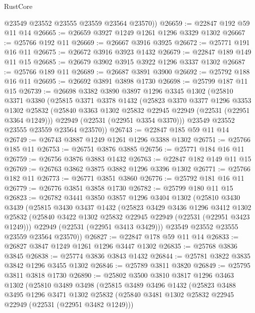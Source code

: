 \begin{lexlean}{RustCore}
\begin{coremodule}
        @23549
        @23552
        @23555
        @23559
        @23564
        @23570))
@26659 := @22847 @192 @59 @11 @14
@26665 := @26659 @3927 @1249 @1261 @1296 @3329 @1302
@26667 := @25766 @192 @11
@26669 := @26667 @3916 @3925
@26672 := @25771 @191 @16 @11
@26675 := @26672 @3916 @3923 @1432
@26679 := @22847 @189 @149 @11 @15
@26685 := @26679 @3902 @3915 @3922 @1296 @3337 @1302
@26687 := @25766 @189 @11
@26689 := @26687 @3891 @3900
@26692 := @25792 @188 @16 @11
@26695 := @26692 @3891 @3898 @1730
@26698 := @25799 @187 @11 @15
@26739 := @26698
    @3382
    @3890
    @3897
    @1296
    @3345
    @1302
    (@25810
      @3371
      @3380
      (@25815
        @3371
        @3378
        @1432
        (@25823
          @3370
          @3377
          @1296
          @3353
          @1302
          @25832
          (@25840 @3363 @1302 @25832 @22945 @22949 (@22531 (@22951 @3364 @1249)))
          @22949
          (@22531 (@22951 @3354 @3370)))
        @23549
        @23552
        @23555
        @23559
        @23564
        @23570))
@26743 := @22847 @185 @59 @11 @14
@26749 := @26743 @3887 @1249 @1261 @1296 @3388 @1302
@26751 := @25766 @185 @11
@26753 := @26751 @3876 @3885
@26756 := @25771 @184 @16 @11
@26759 := @26756 @3876 @3883 @1432
@26763 := @22847 @182 @149 @11 @15
@26769 := @26763 @3862 @3875 @3882 @1296 @3396 @1302
@26771 := @25766 @182 @11
@26773 := @26771 @3851 @3860
@26776 := @25792 @181 @16 @11
@26779 := @26776 @3851 @3858 @1730
@26782 := @25799 @180 @11 @15
@26823 := @26782
    @3441
    @3850
    @3857
    @1296
    @3404
    @1302
    (@25810
      @3430
      @3439
      (@25815
        @3430
        @3437
        @1432
        (@25823
          @3429
          @3436
          @1296
          @3412
          @1302
          @25832
          (@25840 @3422 @1302 @25832 @22945 @22949 (@22531 (@22951 @3423 @1249)))
          @22949
          (@22531 (@22951 @3413 @3429)))
        @23549
        @23552
        @23555
        @23559
        @23564
        @23570))
@26827 := @22847 @178 @59 @11 @14
@26833 := @26827 @3847 @1249 @1261 @1296 @3447 @1302
@26835 := @25768 @3836 @3845
@26838 := @25774 @3836 @3843 @1432
@26844 := @25781 @3822 @3835 @3842 @1296 @3455 @1302
@26846 := @25789 @3811 @3820
@26849 := @25795 @3811 @3818 @1730
@26890 := @25802
    @3500
    @3810
    @3817
    @1296
    @3463
    @1302
    (@25810
      @3489
      @3498
      (@25815
        @3489
        @3496
        @1432
        (@25823
          @3488
          @3495
          @1296
          @3471
          @1302
          @25832
          (@25840 @3481 @1302 @25832 @22945 @22949 (@22531 (@22951 @3482 @1249)))

\end{coremodule}
\end{lexlean}
